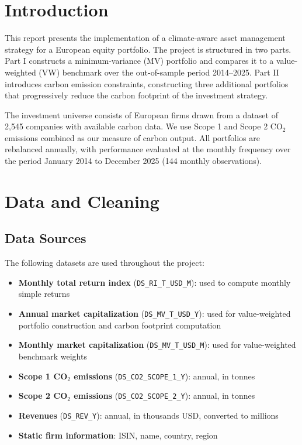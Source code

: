 \documentclass[12pt, a4paper]{article}
\begin{document}
\section{Introduction}

This report presents the implementation of a climate-aware asset management 
strategy for a European equity portfolio. The project is structured in two parts. 
Part I constructs a minimum-variance (MV) portfolio and compares it to a 
value-weighted (VW) benchmark over the out-of-sample period 2014--2025. Part II 
introduces carbon emission constraints, constructing three additional portfolios 
that progressively reduce the carbon footprint of the investment strategy.

The investment universe consists of European firms drawn from a dataset of 2,545 
companies with available carbon data. We use Scope 1 and Scope 2 CO$_2$ emissions 
combined as our measure of carbon output. All portfolios are rebalanced annually, 
with performance evaluated at the monthly frequency over the period January 2014 
to December 2025 (144 monthly observations).

\section{Data and Cleaning}

\subsection{Data Sources}

The following datasets are used throughout the project:

\begin{itemize}
    \item \textbf{Monthly total return index} (\texttt{DS\_RI\_T\_USD\_M}): 
    used to compute monthly simple returns
    \item \textbf{Annual market capitalization} (\texttt{DS\_MV\_T\_USD\_Y}): 
    used for value-weighted portfolio construction and carbon footprint computation
    \item \textbf{Monthly market capitalization} (\texttt{DS\_MV\_T\_USD\_M}): 
    used for value-weighted benchmark weights
    \item \textbf{Scope 1 CO$_2$ emissions} (\texttt{DS\_CO2\_SCOPE\_1\_Y}): 
    annual, in tonnes
    \item \textbf{Scope 2 CO$_2$ emissions} (\texttt{DS\_CO2\_SCOPE\_2\_Y}): 
    annual, in tonnes
    \item \textbf{Revenues} (\texttt{DS\_REV\_Y}): annual, in thousands USD, 
    converted to millions
    \item \textbf{Static firm information}: ISIN, name, country, region
\end{itemize}
\end{document}

